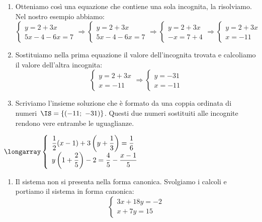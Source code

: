 \begin{exrig}
\begin{enumerate}
 \item Otteniamo così una equazione che contiene una sola 
incognita, la risolviamo.
Nel nostro esempio abbiamo:
\[\left\{\begin{array}{l}y=2+3x\\
5x-4-6x=7\end{array}\right.\Rightarrow
\left\{\begin{array}{l}
         y=2+3x\\
         5x-4-6x=7
        \end{array}\right.\Rightarrow
 \left\{\begin{array}{l}y=2+3x\\
         -x=7+4
        \end{array}\right.\Rightarrow
 \left\{\begin{array}{l}y=2+3x\\
         x=-11
  \end{array}\right.\]

 \item Sostituiamo nella prima equazione il valore dell'incognita trovata e 
calcoliamo il valore dell'altra incognita:
\[ \left\{\begin{array}{l}y=2+3x\\
         x=-11
  \end{array}\right.\Rightarrow
  \left\{\begin{array}{l}
         y=-31\\
         x=-11
  \end{array}\right.\]

 \item Scriviamo l'insieme soluzione che è formato da una coppia ordinata 
 di numeri~$\IS=\{(-11;~-31)\}$. Questi due numeri sostituiti alle incognite 
 rendono vere entrambe le uguaglianze.
\end{enumerate}

\begin{esempio}
$\longarray\left\{\begin{array}{l}
  \dfrac{1}{2}(x-1)+3\left(y+\dfrac{1}{3}\right)=\dfrac{1}{6}\\
  y\left(1+\dfrac{2}{5}\right)-2=\dfrac{4}{5}-\dfrac{x-1}{5}
  \end{array}\right.$

\begin{enumerate}
 \item Il sistema non si presenta nella forma canonica. Svolgiamo i calcoli e 
portiamo il sistema in forma canonica:
\[\left\{\begin{array}{l}3x+18y=-2\\x+7y=15\end{array}\right.\]


\end{enumerate}
\end{esempio}
\end{exrig}
